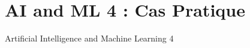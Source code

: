 \documentclass{beamer}
\begin{document}
\section{AI and ML 4 : Cas Pratique}
{
	\begin{frame}{Artificial Intelligence and Machine Learning 4}
	\end{frame}
	
}
\end{document}
